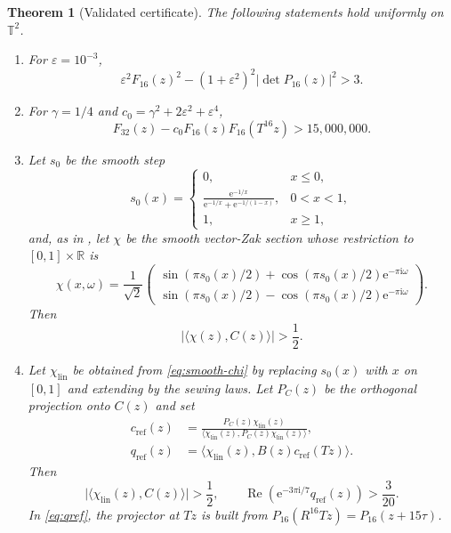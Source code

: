 \documentclass[10pt,a4paper]{amsart}
\numberwithin{equation}{section}
\newtheorem{theorem}{Theorem}[section]
\newcommand{\R}{\mathbb R}
\newcommand{\T}{\mathbb T}
\newcommand{\ip}[2]{\langle #1,#2\rangle}
\newcommand{\abs}[1]{\lvert #1\rvert}
\newcommand{\e}{\mathrm e}
\newcommand{\ii}{\mathrm i}
\begin{document}
\begin{theorem}[Validated certificate]\label{thm:validated-certificate}
The following statements hold uniformly on $\T^2$.
\begin{enumerate}[label=\textup{(C\arabic*)},leftmargin=2.4em]
\item\label{cert:gap}
For $\varepsilon=10^{-3}$,
\[
 \varepsilon^2F_{16}(z)^2-(1+\varepsilon^2)^2
       \abs{\det P_{16}(z)}^2>3.
\]
\item\label{cert:junction}
For $\gamma=1/4$ and
$c_0=\gamma^2+2\varepsilon^2+\varepsilon^4$,
\[
 F_{32}(z)-c_0F_{16}(z)F_{16}(T^{16}z)>15{,}000{,}000.
\]
\item\label{cert:smooth-overlap}
Let $s_0$ be the smooth step
\[
 s_0(x)=
 \begin{cases}
 0,&x\le0,\\
 \displaystyle\frac{\e^{-1/x}}
 {\e^{-1/x}+\e^{-1/(1-x)}},&0<x<1,\\
 1,&x\ge1,
 \end{cases}
\]
and, as in \cite[\S3.3]{FPPV2026}, let $\chi$ be the smooth vector-Zak
section whose restriction to
$[0,1]\times\R$ is
\begin{equation}\label{eq:smooth-chi}
 \chi(x,\omega)=\frac1{\sqrt2}
 \begin{pmatrix}
  \sin(\pi s_0(x)/2)+\cos(\pi s_0(x)/2)\e^{-\pi\ii\omega}\\
  \sin(\pi s_0(x)/2)-\cos(\pi s_0(x)/2)\e^{-\pi\ii\omega}
 \end{pmatrix}.
\end{equation}
Then
\[
 \abs{\ip{\chi(z)}{C(z)}}>\frac12.
\]
\item\label{cert:linear-gauge}
Let $\chi_{\mathrm{lin}}$ be obtained from \eqref{eq:smooth-chi} by replacing
$s_0(x)$ with $x$ on $[0,1]$ and extending by the sewing laws.  Let $P_C(z)$
be the orthogonal projection onto $C(z)$ and set
\begin{align}
 c_{\mathrm{ref}}(z)&=
 \frac{P_C(z)\chi_{\mathrm{lin}}(z)}
 {\ip{\chi_{\mathrm{lin}}(z)}{P_C(z)\chi_{\mathrm{lin}}(z)}},
 \label{eq:cref}\\
 q_{\mathrm{ref}}(z)&=
 \ip{\chi_{\mathrm{lin}}(z)}
 {B(z)c_{\mathrm{ref}}(Tz)}.
 \label{eq:qref}
\end{align}
Then
\begin{equation}\label{eq:linear-cert}
 \abs{\ip{\chi_{\mathrm{lin}}(z)}{C(z)}}>\frac12,\qquad
 \operatorname{Re}\!\left(\e^{-3\pi\ii/7}q_{\mathrm{ref}}(z)\right)
 >\frac3{20}.
\end{equation}
In \eqref{eq:qref}, the projector at $Tz$ is built from
$P_{16}(R^{16}Tz)=P_{16}(z+15\tau)$.
\end{enumerate}
\end{theorem}
\end{document}

